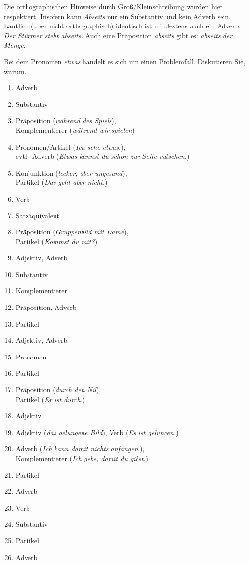 \label{sol:wortklassen05}

Die orthographischen Hinweise durch Groß/Kleinschreibung wurden hier respektiert.
Insofern kann \textit{Abseits} nur ein Substantiv und \zB kein Adverb sein.
Lautlich (aber nicht orthographisch) identisch ist mindestens auch ein Adverb: \textit{Der Stürmer steht abseits.}
Auch eine Präposition \textit{abseits} gibt es: \textit{abseits der Menge}.

Bei dem Pronomen \textit{etwas} handelt es sich um einen Problemfall.
Diskutieren Sie, warum.

\begin{enumerate}
  \item Adverb
  \item Substantiv
  \item Präposition (\textit{während des Spiels}),\\
    Komplementierer (\textit{während wir spielen})
  \item Pronomen\slash Artikel (\textit{Ich sehe etwas.}),\\
    evtl.\ Adverb (\textit{Etwas kannst du schon zur Seite rutschen.})
  \item Konjunktion (\textit{lecker, aber ungesund}),\\
    Partikel (\textit{Das geht aber nicht.})
  \item Verb
  \item Satzäquivalent
  \item Präposition (\textit{Gruppenbild mit Dame}),\\
    Partikel (\textit{Kommst du mit?})
  \item Adjektiv, Adverb
  \item Substantiv
  \item Komplementierer
  \item Präposition, Adverb
  \item Partikel
  \item Adjektiv, Adverb
  \item Pronomen
  \item Partikel
  \item Präposition (\textit{durch den Nil}),\\
    Partikel (\textit{Er ist durch.})
  \item Adjektiv
  \item Adjektiv (\textit{das gelungene Bild}), Verb (\textit{Es ist gelungen.})
  \item Adverb (\textit{Ich kann damit nichts anfangen.}),\\
    Komplementierer (\textit{Ich gebe, damit du gibst.})
  \item Partikel
  \item Adverb
  \item Verb
  \item Substantiv
  \item Partikel
  \item Adverb
\end{enumerate}

